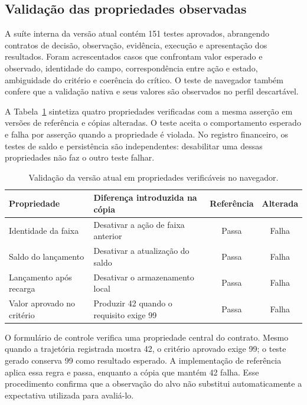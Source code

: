 \documentclass[12pt]{article}
\begin{document}
\subsection{Validação das propriedades observadas}
A suíte interna da versão atual contém 151 testes aprovados, abrangendo contratos de decisão, observação, evidência, execução e apresentação dos resultados. Foram acrescentados casos que confrontam valor esperado e observado, identidade do campo, correspondência entre ação e estado, ambiguidade do critério e coerência do crítico. O teste de navegador também confere que a validação nativa e seus valores são observados no perfil descartável.

A Tabela~\ref{tab:regression} sintetiza quatro propriedades verificadas com a mesma asserção em versões de referência e cópias alteradas. O teste aceita o comportamento esperado e falha por asserção quando a propriedade é violada. No registro financeiro, os testes de saldo e persistência são independentes: desabilitar uma dessas propriedades não faz o outro teste falhar.

\begin{table}[ht]
\centering
\caption{Validação da versão atual em propriedades verificáveis no navegador.}
\label{tab:regression}
\small
\begin{tabular}{>{\raggedright\arraybackslash}p{4.2cm}>{\raggedright\arraybackslash}p{5.7cm}cc}
\toprule
Propriedade & Diferença introduzida na cópia & Referência & Alterada\\
\midrule
Identidade da faixa & Desativar a ação de faixa anterior & Passa & Falha\\
Saldo do lançamento & Desativar a atualização do saldo & Passa & Falha\\
Lançamento após recarga & Desativar o armazenamento local & Passa & Falha\\
Valor aprovado no critério & Produzir 42 quando o requisito exige 99 & Passa & Falha\\
\bottomrule
\end{tabular}
\end{table}

O formulário de controle verifica uma propriedade central do contrato. Mesmo quando a trajetória registrada mostra 42, o critério aprovado exige 99; o teste gerado conserva 99 como resultado esperado. A implementação de referência aplica essa regra e passa, enquanto a cópia que mantém 42 falha. Esse procedimento confirma que a observação do alvo não substitui automaticamente a expectativa utilizada para avaliá-lo.
\end{document}
